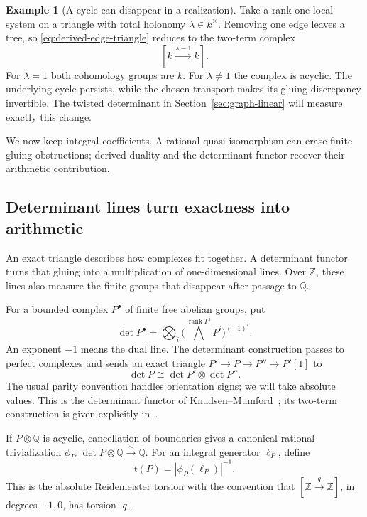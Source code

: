 \documentclass[11pt]{article}
\theoremstyle{definition}
\newtheorem{example}[theorem]{Example}
\theoremstyle{remark}
\newcommand{\Q}{\mathbb Q}
\newcommand{\Z}{\mathbb Z}
\begin{document}
\begin{example}[A cycle can disappear in a realization]
Take a rank-one local system on a triangle with total holonomy $\lambda\in k^\times$. Removing one edge leaves a tree, so \eqref{eq:derived-edge-triangle} reduces to the two-term complex
\[
 [k\xrightarrow{\lambda-1}k].
\]
For $\lambda=1$ both cohomology groups are $k$. For $\lambda\ne1$ the complex is acyclic. The underlying cycle persists, while the chosen transport makes its gluing discrepancy invertible. The twisted determinant in Section~\ref{sec:graph-linear} will measure exactly this change.
\end{example}

We now keep integral coefficients. A rational quasi-isomorphism can erase finite gluing obstructions; derived duality and the determinant functor recover their arithmetic contribution.

\subsection{Determinant lines turn exactness into arithmetic}
\label{sec:derived-determinant}

An exact triangle describes how complexes fit together. A determinant
functor turns that gluing into a multiplication of one-dimensional
lines. Over \(\Z\), these lines also measure the finite groups that
disappear after passage to \(\Q\).

For a bounded complex \(P^\bullet\) of finite free abelian groups, put
\[
 \det P^\bullet=
 \bigotimes_i\bigl(\textstyle\bigwedge^{\operatorname{rank}P^i}P^i
                   \bigr)^{(-1)^i}.
\]
An exponent \(-1\) means the dual line. The determinant construction
passes to perfect complexes and sends an exact triangle
\(P'\to P\to P''\to P'[1]\) to
\[
 \det P\cong\det P'\otimes\det P''.
\]
The usual parity convention handles orientation signs; we will take
absolute values. This is the determinant functor of
Knudsen--Mumford~\cite{derived-knudsen-mumford}; its two-term construction
is given explicitly in~\cite{derived-stacks-determinants}.

If \(P\otimes\Q\) is acyclic, cancellation of boundaries gives a
canonical rational trivialization
\(\phi_P:\det P\otimes\Q\xrightarrow{\sim}\Q\).
For an integral generator \(\ell_P\), define
\[
 \mathfrak t(P)=|\phi_P(\ell_P)|^{-1}.
\]
This is the absolute Reidemeister torsion with the convention that
\([\Z\xrightarrow{q}\Z]\), in degrees \(-1,0\), has torsion \(|q|\).
\end{document}
